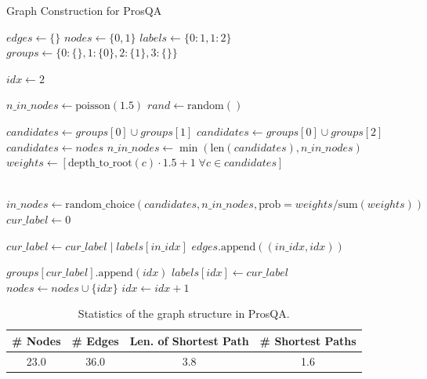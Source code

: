 \documentclass[]{fairmeta}
\begin{document}
\begin{algorithm}
\caption{Graph Construction for ProsQA}\label{alg:prosqa}
\begin{algorithmic}

\State  $edges\gets \{\}$
\State  $nodes\gets \{0, 1\}$
\State  $labels\gets \{0: 1, 1:2\}$ \\ 
\State  $groups\gets \{0: \{\}, 1: \{0\}, 2:\{1\}, 3:\{\}\}$

\State $idx\gets 2$

    
    \State $n\_in\_nodes \gets \text{poisson}(1.5)$
    \State $rand \gets \text{random}()$

        \State $candidates \gets groups[0] \cup groups[1]$
        \State $candidates \gets groups[0] \cup groups[2]$
    \Else
        \State $candidates \gets nodes$
    \EndIf
    \State $n\_in\_nodes \gets \min(\text{len}(candidates), n\_in\_nodes)$
    \State $weights \gets [\text{depth\_to\_root}(c) \cdot 1.5 + 1 \;\forall c \in candidates]$ \\
     \\

    \State $in\_nodes \gets \text{random\_choice}(candidates, n\_in\_nodes, \text{prob} = weights / \text{sum}(weights))$
    \State $cur\_label \gets 0$
    
        \State $cur\_label \gets cur\_label \mid labels[in\_idx]$
        \State $edges.\text{append}((in\_idx, idx))$
    \EndFor
    
    \State $groups[cur\_label].\text{append}(idx)$
    \State $labels[idx] \gets cur\_label$
    \State $nodes \gets nodes \cup \{idx\}$
    \State $idx \gets idx + 1$

\EndWhile
\end{algorithmic}
\end{algorithm}

\begin{table}[]

    \centering
    \begin{tabular}{c|c|c|c}
    \toprule
         \# Nodes & \# Edges & Len. of Shortest Path & \# Shortest Paths \\
         \midrule
           23.0 & 36.0 & 3.8 & 1.6 \\
          \bottomrule
    \end{tabular}
    \captionsetup{justification=centering}
    \caption{Statistics of the graph structure in ProsQA.}
    \label{tab:prosqa}
\end{table}
\end{document}
